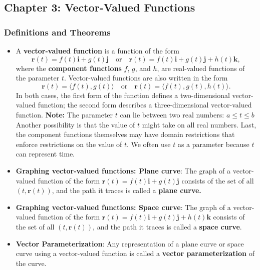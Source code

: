 \documentclass{report}
\begin{document}
\begin{itemize}
    \end{itemize}

    \subsection{Chapter 3: Vector-Valued Functions}
    \bigbreak \noindent 
    \subsubsection{Definitions and Theorems}
    \begin{itemize}
        \item A \textbf{vector-valued function} is a function of the form
            \[
                \mathbf{r}(t) = f(t)\mathbf{i} + g(t)\mathbf{j} \quad \text{or} \quad \mathbf{r}(t) = f(t)\mathbf{i} + g(t)\mathbf{j} + h(t)\mathbf{k},
            \]
            where the \textbf{component functions} $f$, $g$, and $h$, are real-valued functions of the parameter $t$. Vector-valued functions are also written in the form
            \[
                \mathbf{r}(t) = \langle f(t), g(t) \rangle \quad \text{or} \quad \mathbf{r}(t) = \langle f(t), g(t), h(t) \rangle.
            \]
            In both cases, the first form of the function defines a two-dimensional vector-valued function; the second form describes a three-dimensional vector-valued function.
            \bigbreak \noindent 
            \textbf{Note:} The parameter $t$ can lie between two real numbers: $a \leq t \leq b$ Another possibility is that the value of $t$ might take on all real numbers. Last, the component functions themselves may have domain restrictions that enforce restrictions on the value of $t$. We often use $t$ as a parameter because $t$ can represent time.
        \item \textbf{Graphing vector-valued functions: Plane curve}:
            The graph of a vector-valued function of the form \( \mathbf{r}(t) = f(t)\mathbf{i} + g(t)\mathbf{j} \) consists of the set of all \( (t, \mathbf{r}(t)) \), and the path it traces is called a \textbf{plane curve.}
        \item \textbf{Graphing vector-valued functions: Space curve}:
            The graph of a vector-valued function of the form \( \mathbf{r}(t) = f(t)\mathbf{i} + g(t)\mathbf{j} + h(t)\mathbf{k} \) consists of the set of all \( (t, \mathbf{r}(t)) \), and the path it traces is called a \textbf{space curve}.
        \item \textbf{Vector Parameterization}: 
            Any representation of a plane curve or space curve using a vector-valued function is called a \textbf{vector parameterization} of the curve.

\end{itemize}
\end{document}
